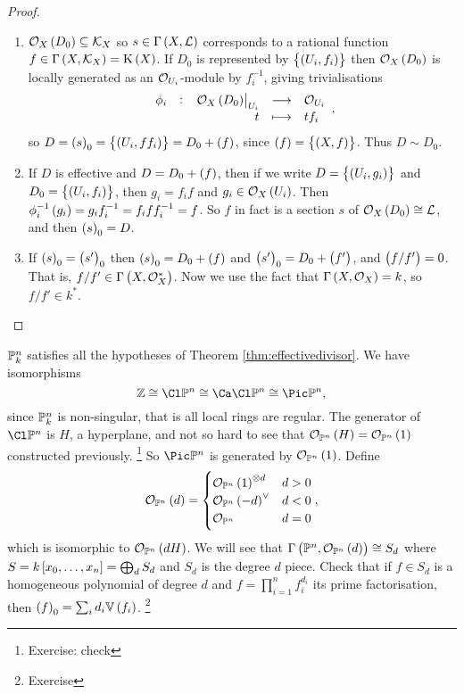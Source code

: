 \begin{proof}
\hfill
\begin{enumerate}
\item $ \OOO_X\br{D_0} \subseteq \KKK_X $ so $ s \in \Gamma\br{X, \LLL} $ corresponds to a rational function $ f \in \Gamma\br{X, \KKK_X} = \K\br{X} $. If $ D_0 $ is represented by $ \cbr{\br{U_i, f_i}} $ then $ \OOO_X\br{D_0} $ is locally generated as an $ \mathcal{O}_{U_i} $-module by $ f_i^{-1} $, giving trivialisations
$$ \function[\phi_i]{\eval{\OOO_X\br{D_0}}_{U_i}}{\OOO_{U_i}}{t}{tf_i}, $$
so $ D = \br{s}_0 = \cbr{\br{U_i, ff_i}} = D_0 + \br{f} $, since $ \br{f} = \cbr{\br{X, f}} $. Thus $ D \sim D_0 $.
\item If $ D $ is effective and $ D = D_0 + \br{f} $, then if we write $ D = \cbr{\br{U_i, g_i}} $ and $ D_0 = \cbr{\br{U_i, f_i}} $, then $ g_i = f_if $ and $ g_i \in \OOO_X\br{U_i} $. Then $ \phi_i^{-1}\br{g_i} = g_if_i^{-1} = f_iff_i^{-1} = f $. So $ f $ in fact is a section $ s $ of $ \OOO_X\br{D_0} \cong \LLL $, and then $ \br{s}_0 = D $.
\item If $ \br{s}_0 = \br{s'}_0 $ then $ \br{s}_0 = D_0 + \br{f} $ and $ \br{s'}_0 = D_0 + \br{f'} $, and $ \br{f / f'} = 0 $. That is, $ f / f' \in \Gamma\br{X, \OOO_X^*} $. Now we use the fact that $ \Gamma\br{X, \OOO_X} = k $, so $ f / f' \in k^* $.
\end{enumerate}
\end{proof}

\begin{example*}
$ \mathbb{P}_k^n $ satisfies all the hypotheses of Theorem \ref{thm:effectivedivisor}. We have isomorphisms
$$ \ZZ \cong \Cl \PP^n \cong \Ca\Cl \PP^n \cong \Pic \PP^n, $$
since $ \mathbb{P}_k^n $ is non-singular, that is all local rings are regular. The generator of $ \Cl \PP^n $ is $ H $, a hyperplane, and not so hard to see that $ \OOO_{\PP^n}\br{H} = \OOO_{\PP^n}\br{1} $ constructed previously. \footnote{Exercise: check} So $ \Pic \PP^n $ is generated by $ \OOO_{\PP^n}\br{1} $. Define
$$ \OOO_{\PP^n}\br{d} =
\begin{cases}
\OOO_{\PP^n}\br{1}^{\otimes d} & d > 0 \\
\OOO_{\PP^n}\br{-d}^\vee & d < 0 \\
\OOO_{\PP^n} & d = 0
\end{cases},
$$
which is isomorphic to $ \OOO_{\PP^n}\br{dH} $. We will see that $ \Gamma\br{\PP^n, \OOO_{\PP^n}\br{d}} \cong S_d $ where $ S = k\sbr{x_0, \dots, x_n} = \bigoplus_d S_d $ and $ S_d $ is the degree $ d $ piece. Check that if $ f \in S_d $ is a homogeneous polynomial of degree $ d $ and $ f = \prod_{i = 1}^n f_i^{d_i} $ its prime factorisation, then $ \br{f}_0 = \sum_i d_i\VV\br{f_i} $. \footnote{Exercise}
\end{example*}

